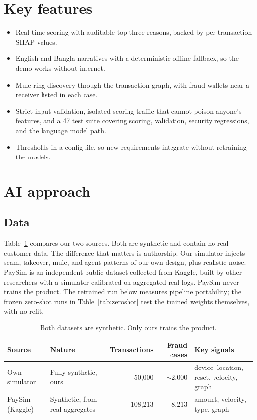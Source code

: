 \documentclass[11pt,a4paper]{article}
\begin{document}
\section{Key features}

\begin{itemize}[nosep]
  \item Real time scoring with auditable top three reasons, backed by per
    transaction SHAP values.
  \item English and Bangla narratives with a deterministic offline fallback,
    so the demo works without internet.
  \item Mule ring discovery through the transaction graph, with fraud wallets
    near a receiver listed in each case.
  \item Strict input validation, isolated scoring traffic that cannot poison
    anyone's features, and a 47 test suite covering scoring, validation,
    security regressions, and the language model path.
  \item Thresholds in a config file, so new requirements integrate without
    retraining the models.
\end{itemize}

\section{AI approach}

\subsection{Data}

Table~\ref{tab:data} compares our two sources. Both are synthetic and contain
no real customer data. The difference that matters is authorship. Our
simulator injects scam, takeover, mule, and agent patterns of our own design,
plus realistic noise. PaySim is an independent public dataset collected from
Kaggle, built by other researchers with a simulator calibrated on aggregated
real logs. PaySim never trains the product. The retrained run below measures
pipeline portability; the frozen zero-shot runs in Table~\ref{tab:zeroshot}
test the trained weights themselves, with no refit.

\begin{table}[htbp]
\centering
\caption{Both datasets are synthetic. Only ours trains the product.}
\label{tab:data}
\begin{tabularx}{\textwidth}{@{}llrrX@{}}
\toprule
Source & Nature & Transactions & Fraud cases & Key signals \\
\midrule
Own simulator & Fully synthetic, ours & 50,000 & $\sim$2,000 & device, location, reset, velocity, graph \\
PaySim (Kaggle) & Synthetic, from real aggregates & 108,213 & 8,213 & amount, velocity, type, graph \\
\bottomrule
\end{tabularx}
\end{table}
\end{document}
